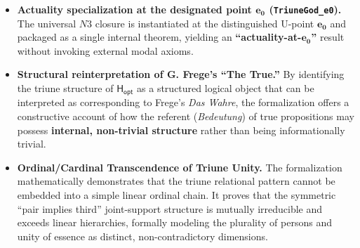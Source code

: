 \documentclass[a4paper, 11pt]{article}
\theoremstyle{plain}
\theoremstyle{definition}
\newcommand{\Hopt}{\mathsf{H_{opt}}}       %
\newcommand{\eZero}{\mathbf{e_0}}         %
\begin{document}
\begin{itemize}
  \item \textbf{Actuality specialization at the designated point $\eZero$ (\texttt{TriuneGod\_e0}).}
  The universal $N3$ closure is instantiated at the distinguished U-point $\eZero$ and packaged as a single internal theorem, yielding an \textbf{``actuality-at-$\eZero$''} result without invoking external modal axioms.

  \item \textbf{Structural reinterpretation of G. Frege's ``The True.''}
  By identifying the triune structure of $\Hopt$ as a structured logical object that can be interpreted as corresponding to Frege's \textit{Das Wahre}, the formalization offers a constructive account of how the referent (\textit{Bedeutung}) of true propositions may possess \textbf{internal, non-trivial structure} rather than being informationally trivial.

  \item \textbf{Ordinal/Cardinal Transcendence of Triune Unity.}
  The formalization mathematically demonstrates that the triune relational pattern cannot be embedded into a simple linear ordinal chain. It proves that the symmetric ``pair implies third'' joint-support structure is mutually irreducible and exceeds linear hierarchies, formally modeling the plurality of persons and unity of essence as distinct, non-contradictory dimensions.

\end{itemize}
\end{document}
